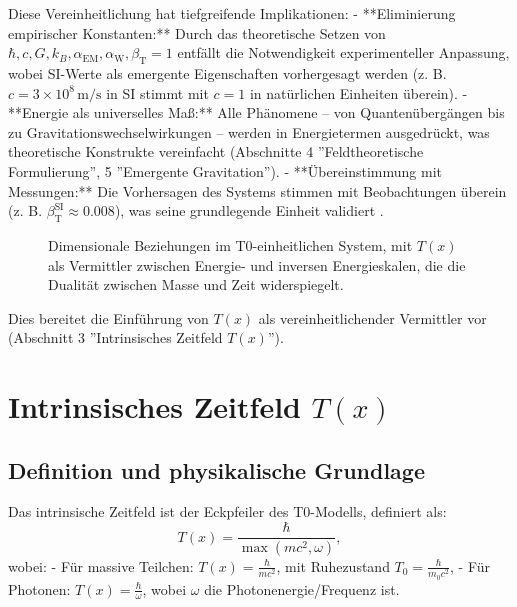 \documentclass[12pt,a4paper]{article}
\newcommand{\Tfield}{T(x)}
\newcommand{\alphaEM}{\alpha_{\text{EM}}}
\newcommand{\alphaW}{\alpha_{\text{W}}}
\newcommand{\betaT}{\beta_{\text{T}}}
\newcommand{\Tzero}{T_0}
\begin{document}
	Diese Vereinheitlichung hat tiefgreifende Implikationen:
	- **Eliminierung empirischer Konstanten:** Durch das theoretische Setzen von \(\hbar, c, G, k_B, \alphaEM, \alphaW, \betaT = 1\) entfällt die Notwendigkeit experimenteller Anpassung, wobei SI-Werte als emergente Eigenschaften vorhergesagt werden (z. B. \(c = 3 \times 10^8 \, \text{m/s}\) in SI stimmt mit \(c = 1\) in natürlichen Einheiten überein).
	- **Energie als universelles Maß:** Alle Phänomene – von Quantenübergängen bis zu Gravitationswechselwirkungen – werden in Energietermen ausgedrückt, was theoretische Konstrukte vereinfacht (Abschnitte 4 ''Feldtheoretische Formulierung'', 5 ''Emergente Gravitation'').
	- **Übereinstimmung mit Messungen:** Die Vorhersagen des Systems stimmen mit Beobachtungen überein (z. B. \(\betaT^{\text{SI}} \approx 0.008\)), was seine grundlegende Einheit validiert \cite{pascher_alphabeta_2025}.
	
	\begin{figure}[ht]
		\centering
		\caption{Dimensionale Beziehungen im T0-einheitlichen System, mit \(\Tfield\) als Vermittler zwischen Energie- und inversen Energieskalen, die die Dualität zwischen Masse und Zeit widerspiegelt.}
		\label{fig:dimensions}
	\end{figure}
	
	Dies bereitet die Einführung von \(\Tfield\) als vereinheitlichender Vermittler vor (Abschnitt 3 ''Intrinsisches Zeitfeld \(\Tfield\)'').
	
	\section{Intrinsisches Zeitfeld \(\Tfield\)}
	\label{sec:intrinsic_time}
	
	\subsection{Definition und physikalische Grundlage}
	\label{subsec:time_definition}
	
	Das intrinsische Zeitfeld ist der Eckpfeiler des T0-Modells, definiert als:
	\begin{equation}
		\Tfield = \frac{\hbar}{\max(mc^2, \omega)},
		\label{eq:intrinsic_time}
	\end{equation}
	wobei:
	- Für massive Teilchen: \(\Tfield = \frac{\hbar}{mc^2}\), mit Ruhezustand \(\Tzero = \frac{\hbar}{m_0 c^2}\),
	- Für Photonen: \(\Tfield = \frac{\hbar}{\omega}\), wobei \(\omega\) die Photonenergie/Frequenz ist.
	
\end{document}
